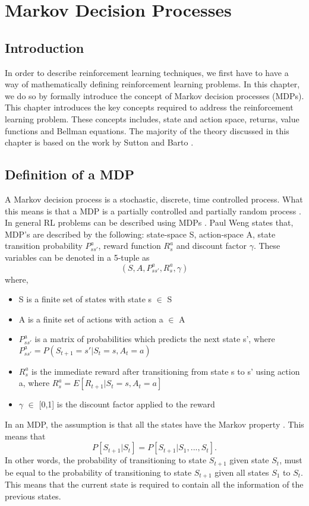 \graphicspath{{MDP/fig/}}

\chapter{Markov Decision Processes}
\label{chap:MDP}
\section{Introduction}

In order to describe reinforcement learning techniques, we first have to have a way of mathematically defining reinforcement learning problems. In this chapter, we do so by formally introduce the concept of Markov decision processes (MDPs). This chapter introduces the key concepts required to address the reinforcement learning problem. These concepts includes, state and action space, returns, value functions and Bellman equations.
The majority of the theory discussed in this chapter is based on the work by Sutton and Barto \cite{sutton_barto}.
\section{Definition of a MDP}
A Markov decision process is a stochastic, discrete, time controlled process. What this means is that a MDP is a partially controlled and partially random process \cite{sutton_barto}.
In general RL problems can be described using MDPs \cite{David_Silver}. 
Paul Weng states that, MDP's are described by the following: state-space S, action-space A, state transition probability $P^{a}_{ss'}$, reward function $R^{a}_{s}$ and discount factor $\gamma$\cite{MDP_Paul_Weng}. These variables can be denoted in a 5-tuple as
\begin{equation}
	(S,A,P^{a}_{ss'},R^{a}_{s},\gamma)
\end{equation}
 where,
\begin{itemize}
	\item S is a finite set of states with state s $\in$ S
	\item A is a finite set of actions with action a $\in$ A
	\item $P^{a}_{ss'}$ is a matrix of probabilities which predicts the next state s', where\\ $P^{a}_{ss'} = P(S_{t+1} = s' | S_t = s,A_t = a) $
	\item $R^{a}_{s}$ is the immediate reward after transitioning from state s to s' using action a, where $R^{a}_{s} = E[R_{t+1}|S_t =s, A_t =a]$
	\item $\gamma$ $\in$ [0,1] is the discount factor applied to the reward
\end{itemize}
In an MDP, the assumption is that all the states have the Markov property \cite{sutton_barto}. This means that
\begin{equation}
	P[S_{t+1}|S_{t}] = P[S_{t+1}|S_{1},...,S_{t}].
\end{equation}
In other words, the probability of transitioning to state $S_{t+1}$ given state $S_t$, must be equal to the probability of transitioning to state $S_{t+1}$ given all states $S_1$ to $S_t$. This means that the current state is required to contain all the information of the previous states.


